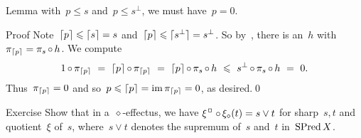 \documentclass[b]{subfiles}
\begin{document}
\begin{parsec}
\begin{point}{Lemma}
    with~$p \leq s$ and~$p \leq s^\perp$,
    we must have~$p = 0$.
\begin{point}{Proof}%
Note~$\left\lceil p\right\rceil \leqslant \left\lceil s\right\rceil = s$
    and~$\left\lceil p\right\rceil \leqslant \lceil s^\perp\rceil = s^\perp$.
So by~,
there is an~$h$ with~$\pi_{\left\lceil p\right\rceil} = \pi_s \mathop{\circ} h$.
We compute
\begin{equation*}
    1 \after \pi_{\ceil{p}} \ =\  \ceil{p} \after \pi_{\ceil{p}}  \ = \
    \ceil{p} \after \pi_s \after h \ \leq \ 
        s^\perp \after \pi_s \after h \ = \ 0.
\end{equation*}
Thus~$\pi_{\left\lceil p\right\rceil} = 0$
and so~$p \leqslant \left\lceil p\right\rceil = \operatorname{im}\pi_{\left\lceil p\right\rceil} = 0$, as desired.\qed
\end{point}
\end{point}
\begin{point}{Exercise}%
Show that in a~$\diamond$-effectus,
we have
        $\xi^\BOX \after \xi_\diamond (t) = s \vee t$
    for sharp~$s,t$ and  quotient~$\xi$ of~$s$,
    where~$s \vee t$ denotes the supremum
    of~$s$ and~$t$ in~$\operatorname{SPred} X$.
\end{point}
\end{parsec}
\end{document}
